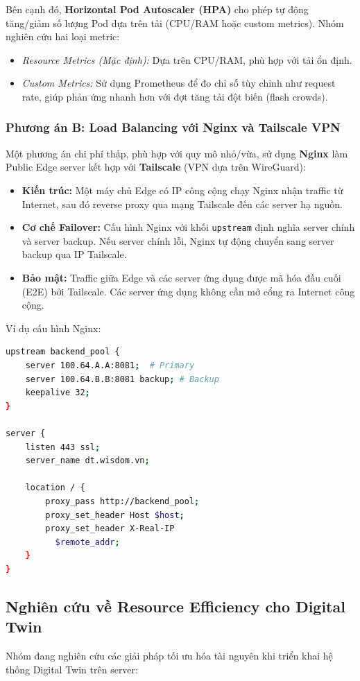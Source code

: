 \documentclass[twocolumn]{article}
\begin{document}
Bên cạnh đó, \textbf{Horizontal Pod Autoscaler (HPA)} cho phép tự động tăng/giảm số lượng Pod dựa trên tải (CPU/RAM hoặc custom metrics). Nhóm nghiên cứu hai loại metric:
\begin{itemize}[noitemsep]
	\item \textit{Resource Metrics (Mặc định):} Dựa trên CPU/RAM, phù hợp với tải ổn định.
	\item \textit{Custom Metrics:} Sử dụng Prometheus để đo chỉ số tùy chỉnh như request rate, giúp phản ứng nhanh hơn với đợt tăng tải đột biến (flash crowds).
\end{itemize}

\subsubsection{Phương án B: Load Balancing với Nginx và Tailscale VPN}
Một phương án chi phí thấp, phù hợp với quy mô nhỏ/vừa, sử dụng \textbf{Nginx} làm Public Edge server kết hợp với \textbf{Tailscale} (VPN dựa trên WireGuard):

\begin{itemize}
	\item \textbf{Kiến trúc:} Một máy chủ Edge có IP công cộng chạy Nginx nhận traffic từ Internet, sau đó reverse proxy qua mạng Tailscale đến các server hạ nguồn.
	\item \textbf{Cơ chế Failover:} Cấu hình Nginx với khối \texttt{upstream} định nghĩa server chính và server backup. Nếu server chính lỗi, Nginx tự động chuyển sang server backup qua IP Tailscale.
	\item \textbf{Bảo mật:} Traffic giữa Edge và các server ứng dụng được mã hóa đầu cuối (E2E) bởi Tailscale. Các server ứng dụng không cần mở cổng ra Internet công cộng.
\end{itemize}

Ví dụ cấu hình Nginx:
\begin{lstlisting}[language=bash, caption={Cấu hình upstream trong Nginx}]
upstream backend_pool {
    server 100.64.A.A:8081;  # Primary
    server 100.64.B.B:8081 backup; # Backup
    keepalive 32;
}

server {
    listen 443 ssl;
    server_name dt.wisdom.vn;
    
    location / {
        proxy_pass http://backend_pool;
        proxy_set_header Host $host;
        proxy_set_header X-Real-IP
          $remote_addr;
    }
}
\end{lstlisting}

\subsection{Nghiên cứu về Resource Efficiency cho Digital Twin}
Nhóm đang nghiên cứu các giải pháp tối ưu hóa tài nguyên khi triển khai hệ thống Digital Twin trên server:
\end{document}
